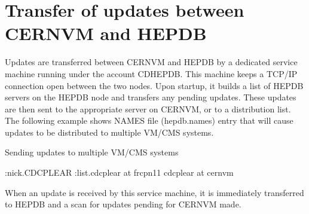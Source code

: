 \section{Transfer of updates between CERNVM and HEPDB}

Updates are transferred between CERNVM and HEPDB by a dedicated service
machine running under the account CDHEPDB. This machine keeps
a TCP/IP connection open between the two nodes. Upon startup, it builds
a list of HEPDB servers on the HEPDB node and transfers any pending
updates. These updates are then sent to the appropriate server on
CERNVM, or to a distribution list. The following example shows 
NAMES file (hepdb.names) entry that will cause 
updates to be distributed to multiple VM/CMS systems.

\begin{XMPt}{Sending updates to multiple VM/CMS systems}
 
:nick.CDCPLEAR
               :list.cdcplear at frcpn11 cdcplear at cernvm
 
\end{XMPt}

When an update is received by this service machine, it is immediately
transferred to HEPDB and a scan for updates pending for CERNVM made.

